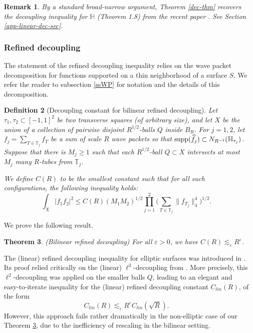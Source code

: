 \documentclass{amsart}%
\numberwithin{equation}{section}
\newtheorem{theorem}{Theorem}[section]
\newtheorem{remark}[theorem]{Remark}
\newtheorem{definition}[theorem]{Definition}
\newcommand{\e}{\varepsilon}
\newcommand{\wh}{\widehat}
\newcommand{\ZT}{\mathbb{T}}
\newcommand{\ZH}{\mathbb{H}}
\newcommand{\1}{\mathbbm{1}}
\begin{document}
    

\begin{remark}
\rm


By a standard broad-narrow argument, Theorem \ref{dec-thm}  recovers the decoupling inequality for $\ZH$ (Theorem 1.8) from the recent paper \cite{GMO}.
See Section \eqref{app-linear-dec-sec}.
\end{remark}


\medskip

\subsubsection{Refined decoupling}

The statement of the refined decoupling inequality relies on the wave packet decomposition for functions supported on a thin neighborhood of a surface $S$.
We refer the reader to subsection \ref{ssWP} for notation and the details of this decomposition. 

\begin{definition}[Decoupling constant for bilinear refined decoupling]

Let $\tau_1,\tau_2\subset[-1,1]^2$ be two transverse squares (of arbitrary size), and let $X$ be the union of a collection of pairwise disjoint $R^{1/2}$-balls $Q$ inside $B_R$. 
For $j=1,2$, let $f_j=\sum_{T\in\ZT_j}f_T$ be a sum of scale $R$ wave packets so that ${\rm supp}(\wh f_j)\subset N_{R^{-1}}(\ZH_{\tau_j})$.
Suppose that  there is $M_j\geq1$ such that each $R^{1/2}$-ball $Q\subset X$ intersects at most $M_j$ many $R$-tubes from $\ZT_j$.

We define $C(R)$ to be the smallest constant such that for all such configurations, the following inequality  holds:
\begin{equation}
\label{ref-dec-esti}	
    \int_X|f_1f_2|^2\le C(R) (M_1M_2)^{1/2}\prod_{j=1}^2\Big(\sum_{T\in\ZT_j}\big\|f_{T_j}\big\|_4^4\Big)^{1/2}.   
\end{equation}	   
\end{definition}
We prove the following result. 
\begin{theorem}(Bilinear refined decoupling)
\label{refined-dec-thm}
For all $\e>0$, we have	$C(R)\lesssim_\e R^\e$.
\end{theorem}


\smallskip

The (linear) refined decoupling inequality for elliptic surfaces was introduced in \cite{GIOW}.
Its proof relied critically on the (linear) $\ell^2$-decoupling from \cite{Bourgain-Demeter-l2}.
More precisely, this $\ell^2$-decoupling was applied on the smaller balls $Q$, leading to an elegant and easy-to-iterate inequality for the (linear) refined decoupling constant $C_{lin}(R)$, of the form 
$$C_{lin}(R)\lesssim_\e R^{\e}C_{lin}(\sqrt{R}).$$
However, this approach fails rather dramatically in the non-elliptic case of our Theorem \ref{refined-dec-thm}, due to the inefficiency of rescaling in the bilinear setting.  
\end{document}
